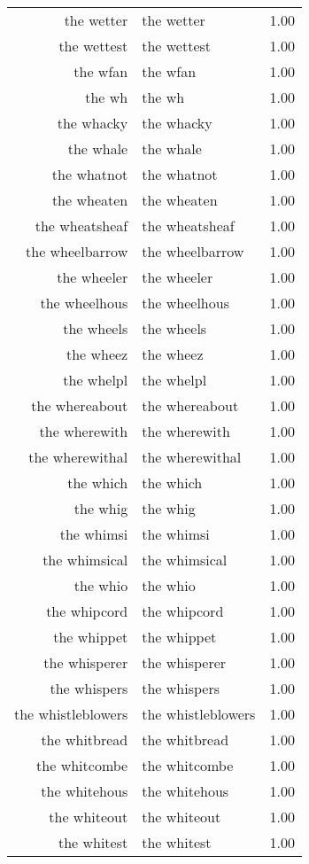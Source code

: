 \begin{table}[ht]
\begin{tabular}{rlr}
  the wetter & the wetter & 1.00 \\ 
  the wettest & the wettest & 1.00 \\ 
  the wfan & the wfan & 1.00 \\ 
  the wh & the wh & 1.00 \\ 
  the whacky & the whacky & 1.00 \\ 
  the whale & the whale & 1.00 \\ 
  the whatnot & the whatnot & 1.00 \\ 
  the wheaten & the wheaten & 1.00 \\ 
  the wheatsheaf & the wheatsheaf & 1.00 \\ 
  the wheelbarrow & the wheelbarrow & 1.00 \\ 
  the wheeler & the wheeler & 1.00 \\ 
  the wheelhous & the wheelhous & 1.00 \\ 
  the wheels & the wheels & 1.00 \\ 
  the wheez & the wheez & 1.00 \\ 
  the whelpl & the whelpl & 1.00 \\ 
  the whereabout & the whereabout & 1.00 \\ 
  the wherewith & the wherewith & 1.00 \\ 
  the wherewithal & the wherewithal & 1.00 \\ 
  the which & the which & 1.00 \\ 
  the whig & the whig & 1.00 \\ 
  the whimsi & the whimsi & 1.00 \\ 
  the whimsical & the whimsical & 1.00 \\ 
  the whio & the whio & 1.00 \\ 
  the whipcord & the whipcord & 1.00 \\ 
  the whippet & the whippet & 1.00 \\ 
  the whisperer & the whisperer & 1.00 \\ 
  the whispers & the whispers & 1.00 \\ 
  the whistleblowers & the whistleblowers & 1.00 \\ 
  the whitbread & the whitbread & 1.00 \\ 
  the whitcombe & the whitcombe & 1.00 \\ 
  the whitehous & the whitehous & 1.00 \\ 
  the whiteout & the whiteout & 1.00 \\ 
  the whitest & the whitest & 1.00 \\ 

\end{tabular}
\end{table}
